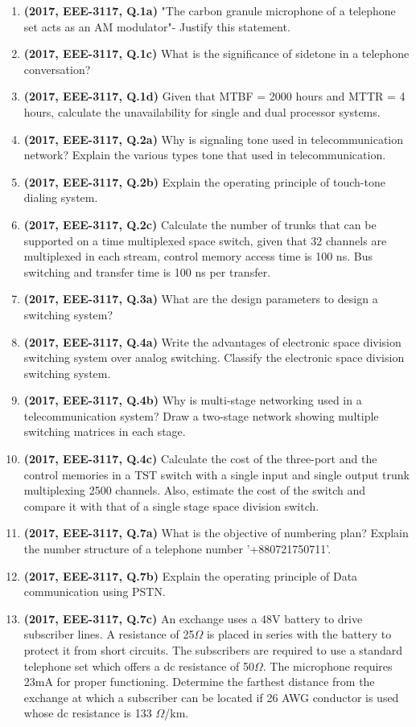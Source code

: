 \documentclass[12pt, a4paper]{article}
\begin{document}
\begin{enumerate}
		\item \textbf{(2017, EEE-3117, Q.1a)} "The carbon granule microphone of a telephone set acts as an AM modulator"- Justify this statement.
		\item \textbf{(2017, EEE-3117, Q.1c)} What is the significance of sidetone in a telephone conversation?
		\item \textbf{(2017, EEE-3117, Q.1d)} Given that MTBF = 2000 hours and MTTR = 4 hours, calculate the unavailability for single and dual processor systems.
		\item \textbf{(2017, EEE-3117, Q.2a)} Why is signaling tone used in telecommunication network? Explain the various types tone that used in telecommunication.
		\item \textbf{(2017, EEE-3117, Q.2b)} Explain the operating principle of touch-tone dialing system.
		\item \textbf{(2017, EEE-3117, Q.2c)} Calculate the number of trunks that can be supported on a time multiplexed space switch, given that 32 channels are multiplexed in each stream, control memory access time is 100 ns. Bus switching and transfer time is 100 ns per transfer.
		\item \textbf{(2017, EEE-3117, Q.3a)} What are the design parameters to design a switching system?
		\item \textbf{(2017, EEE-3117, Q.4a)} Write the advantages of electronic space division switching system over analog switching. Classify the electronic space division switching system.
		\item \textbf{(2017, EEE-3117, Q.4b)} Why is multi-stage networking used in a telecommunication system? Draw a two-stage network showing multiple switching matrices in each stage.
		\item \textbf{(2017, EEE-3117, Q.4c)} Calculate the cost of the three-port and the control memories in a TST switch with a single input and single output trunk multiplexing 2500 channels. Also, estimate the cost of the switch and compare it with that of a single stage space division switch.
		\item \textbf{(2017, EEE-3117, Q.7a)} What is the objective of numbering plan? Explain the number structure of a telephone number '+880721750711'.
		\item \textbf{(2017, EEE-3117, Q.7b)} Explain the operating principle of Data communication using PSTN.
		\item \textbf{(2017, EEE-3117, Q.7c)} An exchange uses a 48V battery to drive subscriber lines. A resistance of 25$\Omega$ is placed in series with the battery to protect it from short circuits. The subscribers are required to use a standard telephone set which offers a dc resistance of 50$\Omega$. The microphone requires 23mA for proper functioning. Determine the farthest distance from the exchange at which a subscriber can be located if 26 AWG conductor is used whose dc resistance is 133 $\Omega$/km.

\end{enumerate}
\end{document}

